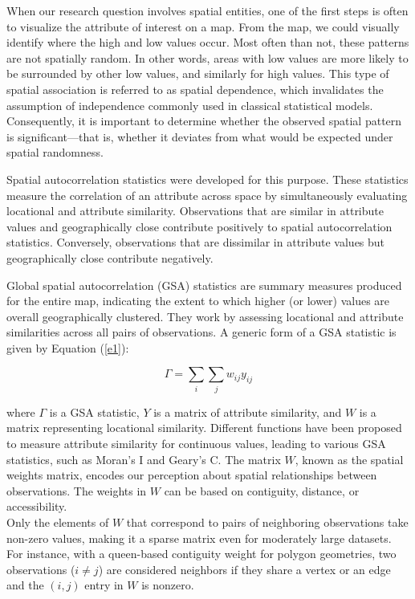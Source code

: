 \documentclass[
]{aft}
\begin{document}
When our research question involves spatial entities, one of the first
steps is often to visualize the attribute of interest on a map. From the
map, we could visually identify where the high and low values occur.
Most often than not, these patterns are not spatially random. In other
words, areas with low values are more likely to be surrounded by other
low values, and similarly for high values. This type of spatial
association is referred to as spatial dependence, which invalidates the
assumption of independence commonly used in classical statistical
models. Consequently, it is important to determine whether the observed
spatial pattern is significant---that is, whether it deviates from what
would be expected under spatial randomness.

Spatial autocorrelation statistics were developed for this purpose.
These statistics measure the correlation of an attribute across space by
simultaneously evaluating locational and attribute similarity.
Observations that are similar in attribute values and geographically
close contribute positively to spatial autocorrelation statistics.
Conversely, observations that are dissimilar in attribute values but
geographically close contribute negatively.

Global spatial autocorrelation (GSA) statistics are summary measures
produced for the entire map, indicating the extent to which higher (or
lower) values are overall geographically clustered. They work by
assessing locational and attribute similarities across all pairs of
observations. A generic form of a GSA statistic is given by Equation
(\ref{e1}):

\begin{equation}
\label{e1}
\Gamma = \sum_i \sum_j w_{ij} y_{ij} 
\end{equation}

where \(\Gamma\) is a GSA statistic, \(Y\) is a matrix of attribute
similarity, and \(W\) is a matrix representing locational similarity.
Different functions have been proposed to measure attribute similarity
for continuous values, leading to various GSA statistics, such as
Moran's I and Geary's C. The matrix \(W\), known as the spatial weights
matrix, encodes our perception about spatial relationships between
observations. The weights in \(W\) can be based on contiguity, distance,
or accessibility.\\
Only the elements of \(W\) that correspond to pairs of neighboring
observations take non-zero values, making it a sparse matrix even for
moderately large datasets. For instance, with a queen-based contiguity
weight for polygon geometries, two observations (\(i \neq j\)) are
considered neighbors if they share a vertex or an edge and the \((i,j)\)
entry in \(W\) is nonzero.
\end{document}
